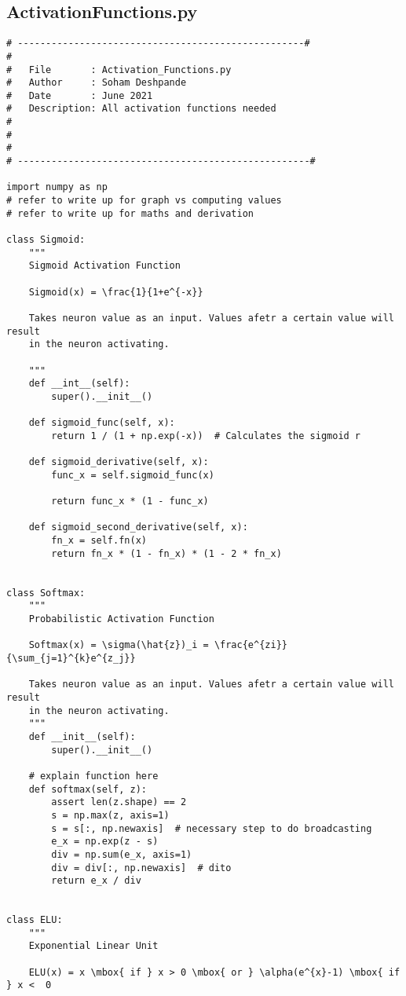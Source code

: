 \documentclass{article}
\begin{document}
\subsection{ActivationFunctions.py}
\begin{lstlisting}
# ---------------------------------------------------#
#
#   File       : Activation_Functions.py
#   Author     : Soham Deshpande
#   Date       : June 2021
#   Description: All activation functions needed
#
#
#
# ----------------------------------------------------#

import numpy as np
# refer to write up for graph vs computing values
# refer to write up for maths and derivation

class Sigmoid:
    """
    Sigmoid Activation Function

    Sigmoid(x) = \frac{1}{1+e^{-x}}

    Takes neuron value as an input. Values afetr a certain value will result
    in the neuron activating.

    """
    def __int__(self):
        super().__init__()

    def sigmoid_func(self, x):
        return 1 / (1 + np.exp(-x))  # Calculates the sigmoid r

    def sigmoid_derivative(self, x):
        func_x = self.sigmoid_func(x)

        return func_x * (1 - func_x)

    def sigmoid_second_derivative(self, x):
        fn_x = self.fn(x)
        return fn_x * (1 - fn_x) * (1 - 2 * fn_x)


class Softmax:
    """
    Probabilistic Activation Function

    Softmax(x) = \sigma(\hat{z})_i = \frac{e^{zi}}{\sum_{j=1}^{k}e^{z_j}}

    Takes neuron value as an input. Values afetr a certain value will result
    in the neuron activating.
    """
    def __init__(self):
        super().__init__()

    # explain function here
    def softmax(self, z):
        assert len(z.shape) == 2
        s = np.max(z, axis=1)
        s = s[:, np.newaxis]  # necessary step to do broadcasting
        e_x = np.exp(z - s)
        div = np.sum(e_x, axis=1)
        div = div[:, np.newaxis]  # dito
        return e_x / div


class ELU:
    """
    Exponential Linear Unit

    ELU(x) = x \mbox{ if } x > 0 \mbox{ or } \alpha(e^{x}-1) \mbox{ if } x <  0


\end{lstlisting}
\end{document}
